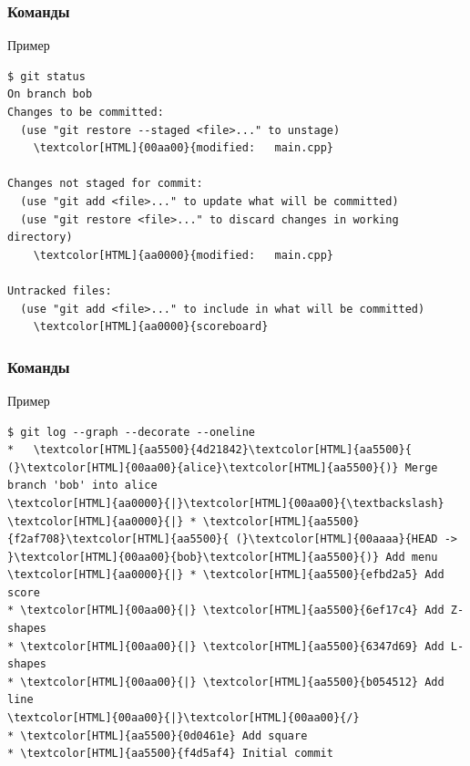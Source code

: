\documentclass[pdf,russian]{beamer}
\begin{document}
\begin{frame}[fragile]
    \frametitle{Команды}
    \begin{exampleblock}{Пример}
        \begin{Verbatim}[fontsize=\relsize{-3},commandchars=\\\{\}]
$ git status
On branch bob
Changes to be committed:
  (use "git restore --staged <file>..." to unstage)
	\textcolor[HTML]{00aa00}{modified:   main.cpp}

Changes not staged for commit:
  (use "git add <file>..." to update what will be committed)
  (use "git restore <file>..." to discard changes in working directory)
	\textcolor[HTML]{aa0000}{modified:   main.cpp}

Untracked files:
  (use "git add <file>..." to include in what will be committed)
	\textcolor[HTML]{aa0000}{scoreboard}
        \end{Verbatim}
    \end{exampleblock}
\end{frame}

\begin{frame}[fragile]
    \frametitle{Команды}
    \begin{exampleblock}{Пример}
        \begin{Verbatim}[commandchars=\\\{\}]
$ git log --graph --decorate --oneline
*   \textcolor[HTML]{aa5500}{4d21842}\textcolor[HTML]{aa5500}{ (}\textcolor[HTML]{00aa00}{alice}\textcolor[HTML]{aa5500}{)} Merge branch 'bob' into alice
\textcolor[HTML]{aa0000}{|}\textcolor[HTML]{00aa00}{\textbackslash}
\textcolor[HTML]{aa0000}{|} * \textcolor[HTML]{aa5500}{f2af708}\textcolor[HTML]{aa5500}{ (}\textcolor[HTML]{00aaaa}{HEAD -> }\textcolor[HTML]{00aa00}{bob}\textcolor[HTML]{aa5500}{)} Add menu
\textcolor[HTML]{aa0000}{|} * \textcolor[HTML]{aa5500}{efbd2a5} Add score
* \textcolor[HTML]{00aa00}{|} \textcolor[HTML]{aa5500}{6ef17c4} Add Z-shapes
* \textcolor[HTML]{00aa00}{|} \textcolor[HTML]{aa5500}{6347d69} Add L-shapes
* \textcolor[HTML]{00aa00}{|} \textcolor[HTML]{aa5500}{b054512} Add line
\textcolor[HTML]{00aa00}{|}\textcolor[HTML]{00aa00}{/}
* \textcolor[HTML]{aa5500}{0d0461e} Add square
* \textcolor[HTML]{aa5500}{f4d5af4} Initial commit
        \end{Verbatim}
    \end{exampleblock}
\end{frame}
\end{document}

